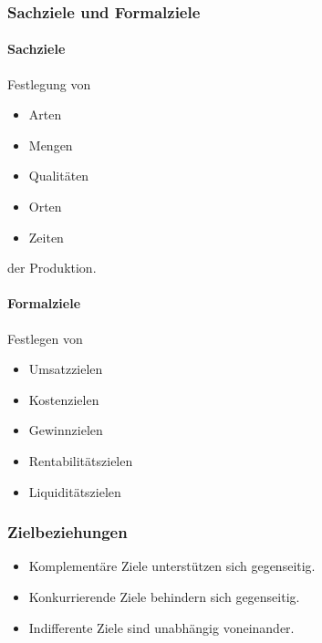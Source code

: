 \documentclass[../main.tex]{subfiles}
\begin{document}
            \subsubsection{Sachziele und Formalziele}
                \paragraph{Sachziele}
                    Festlegung von
                    \begin{itemize}
                        \item Arten
                        \item Mengen
                        \item Qualitäten
                        \item Orten
                        \item Zeiten
                    \end{itemize}
                    der Produktion.
            
                \paragraph{Formalziele}
                    Festlegen von
                    \begin{itemize}
                        \item Umsatzzielen
                        \item Kostenzielen
                        \item Gewinnzielen
                        \item Rentabilitätszielen
                        \item Liquiditätszielen
                    \end{itemize}
                    
            \subsubsection{Zielbeziehungen}
                \begin{itemize}
                    \item Komplementäre Ziele unterstützen sich gegenseitig.
                    \item Konkurrierende Ziele behindern sich gegenseitig.
                    \item Indifferente Ziele sind unabhängig voneinander.
                \end{itemize}
                
\end{document}
